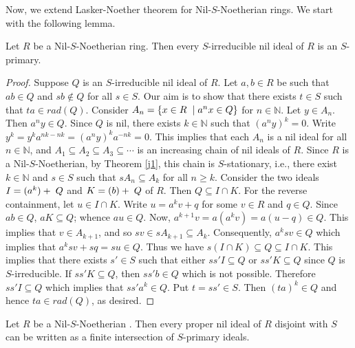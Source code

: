 \documentclass[11pt]{article}
\begin{document}
\noindent
Now, we extend Lasker-Noether theorem for Nil-$S$-Noetherian rings. We start with the following lemma.
\begin{lem}\label{sp}
	\noindent
	Let $R$ be a Nil-$S$-Noetherian ring. Then every $S$-irreducible nil ideal of $R$ is an $S$-primary.
\end{lem}
\begin{proof}
	Suppose $Q$ is an $S$-irreducible nil ideal of $R$. Let $a,b\in R$ be such that $ab\in Q$ and $sb\notin Q$ for all $s\in S$. Our aim is to show that there exists $t\in S$ such that $ta\in rad(Q)$. Consider $A_n=\{x\in R\hspace{0.2cm}|\hspace{0.1cm} a^{n}x\in Q \}$ for $n\in\mathbb{N}$. Let $y\in A_{n}$. Then $a^{n}y\in Q$. Since $Q$ is nil, there exists $k\in\mathbb{N}$ such that $(a^{n}y)^{k}=0$. Write $y^{k}=y^{k} a^{nk-nk}=(a^{n}y)^{k} a^{-nk}=0$. This implies that each $A_{n}$ is a nil ideal for all $n\in\mathbb{N}$, and $A_1\subseteq A_2\subseteq A_3\subseteq \cdots$ is an increasing chain of nil ideals of $R$. Since $R$ is a Nil-$S$-Noetherian, by Theorem \ref{j1}, this chain is $S$-stationary, i.e., there exist $k\in \mathbb{N}$ and $s\in S$ such that $sA_n\subseteq A_k$ for all $n\geq k$. Consider the two ideals $I=(a^{k}) +\hspace{0.1cm} Q$ and $K=(b) +\hspace{0.1cm} Q$ of $R$. Then  $Q\subseteq I\cap K$. For the reverse containment, let $u\in I\cap K$. Write  $u=a^{k}v+q$ for some $v\in R$ and $q\in Q$. Since $ab\in Q$, $aK\subseteq Q$; whence $au\in Q$. Now, $a^{k+1}v=a(a^{k}v)=a(u-q)\in Q$. This implies that $v\in A_{k+1}$, and so  $sv\in sA_{k+1}\subseteq A_k$. Consequently, $a^{k}sv\in Q $ which implies that  $a^{k}sv +sq=su\in Q$. Thus we have $s(I\cap K)\subseteq Q\subseteq I\cap K$. This implies that there exists $s'\in S$ such that either $ss'I\subseteq Q$ or $ss'K\subseteq Q$ since $Q$ is $S$-irreducible. If $ss'K\subseteq Q$, then $ss'b\in Q$  which is not possible. Therefore $ss'I\subseteq Q$ which implies that $ss'a^{k}\in Q$. Put $t=ss'\in S$. Then $(ta)^{k} \in Q$ and hence  $ta\in rad(Q)$, as desired.
\end{proof}

\begin{theorem}\label{on}
	\noindent
	Let $R$ be a Nil-$S$-Noetherian . Then every proper nil ideal of $R$ disjoint with $S$ can be written as a finite intersection of $S$-primary ideals.
\end{theorem}
\end{document}
